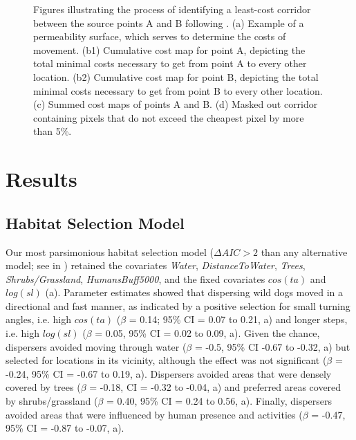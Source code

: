 \documentclass[abstract=on,10pt,a4paper,bibliography=totocnumbered]{scrartcl}
\begin{document}
\begin{figure}[hbtp]
\begin{center}
  \caption{Figures illustrating the process of identifying a least-cost corridor
  between the source points A and B following \citep{Pinto.2009}. (a) Example of
  a permeability surface, which serves to determine the costs of movement. (b1)
  Cumulative cost map for point A, depicting the total minimal costs necessary
  to get from point A to every other location. (b2) Cumulative cost map for
  point B, depicting the total minimal costs necessary to get from point B to
  every other location. (c) Summed cost maps of points A and B. (d) Masked out
  corridor containing pixels that do not exceed the cheapest pixel by more than
  5\%.}
  \label{LCCExample}
  \end{center}
\end{figure}

\newpage
\section{Results}
\subsection{Habitat Selection Model}
Our most parsimonious habitat selection model (\(\Delta AIC > 2\) than any
alternative model; see  in ) retained the covariates
\textit{Water}, \textit{DistanceToWater}, \textit{Trees},
\textit{Shrubs/Grassland}, \textit{HumansBuff5000}, and the fixed covariates
\(cos(ta)\) and \(log(sl)\) (a). Parameter estimates
showed that dispersing wild dogs moved in a directional and fast manner, as
indicated by a positive selection for small turning angles, i.e. high
\(cos(ta)\) (\(\beta\) = 0.14; 95\% CI = 0.07 to 0.21,
a) and longer steps, i.e. high \(log(sl)\) (\(\beta\)
= 0.05, 95\% CI = 0.02 to 0.09, a). Given the chance,
dispersers avoided moving through water (\(\beta\) = -0.5, 95\% CI -0.67 to
-0.32, a) but selected for locations in its vicinity,
although the effect was not significant (\(\beta\) = -0.24, 95\% CI = -0.67 to
0.19, a). Dispersers avoided areas that were densely
covered by trees (\(\beta\) = -0.18, CI = -0.32 to -0.04,
a) and preferred areas covered by shrubs/grassland
(\(\beta\) = 0.40, 95\% CI = 0.24 to 0.56, a).
Finally, dispersers avoided areas that were influenced by human presence and
activities (\(\beta\) = -0.47, 95\% CI = -0.87 to -0.07,
a).
\end{document}
